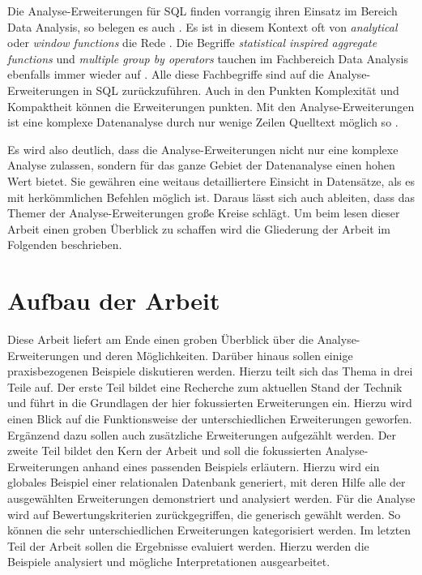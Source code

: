 Die Analyse-Erweiterungen für SQL finden vorrangig ihren Einsatz im Bereich Data
Analysis, so belegen es auch \citet[Kapitel 3]{FOTACHE2015243}. Es ist in diesem
Kontext oft von \textit{analytical} oder \textit{window functions} die Rede
\citep[vgl.][Kapitel 3]{FOTACHE2015243}. Die Begriffe \textit{statistical
inspired aggregate functions} und \textit{multiple group by operators} tauchen im
Fachbereich Data Analysis ebenfalls immer wieder auf \citep[vgl.][Kapitel 4.3]{FOTACHE2015243}.
Alle diese Fachbegriffe sind auf die Analyse-Erweiterungen in SQL zurückzuführen.
Auch in den Punkten Komplexität und Kompaktheit können die Erweiterungen punkten.
Mit den Analyse-Erweiterungen ist eine komplexe Datenanalyse durch nur wenige
Zeilen Quelltext möglich so \citet[vgl.][]{Maue2022}.

Es wird also deutlich, dass die Analyse-Erweiterungen nicht nur eine komplexe
Analyse zulassen, sondern für das ganze Gebiet der Datenanalyse einen hohen Wert
bietet. Sie gewähren eine weitaus detailliertere Einsicht in Datensätze, als es mit
herkömmlichen Befehlen möglich ist. Daraus lässt sich auch ableiten, dass das Themer
der Analyse-Erweiterungen große Kreise schlägt. Um beim lesen dieser Arbeit
einen groben Überblick zu schaffen wird die Gliederung der Arbeit im Folgenden
beschrieben.

\section{Aufbau der Arbeit}
\label{sec:aufbau_der_arbeit} Diese Arbeit liefert am Ende einen groben
Überblick über die Analyse-Erweiterungen und deren Möglichkeiten. Darüber hinaus
sollen einige praxisbezogenen Beispiele diskutieren werden. Hierzu teilt sich
das Thema in drei Teile auf. Der erste Teil bildet eine Recherche zum aktuellen Stand
der Technik und führt in die Grundlagen der hier fokussierten Erweiterungen ein.
Hierzu wird einen Blick auf die Funktionsweise der unterschiedlichen
Erweiterungen geworfen. Ergänzend dazu sollen auch zusätzliche Erweiterungen aufgezählt
werden. Der zweite Teil bildet den Kern der Arbeit und soll die fokussierten
Analyse-Erweiterungen anhand eines passenden Beispiels erläutern. Hierzu wird ein
globales Beispiel einer relationalen Datenbank generiert, mit deren Hilfe alle
der ausgewählten Erweiterungen demonstriert und analysiert werden. Für die Analyse
wird auf Bewertungskriterien zurückgegriffen, die generisch gewählt werden. So können
die sehr unterschiedlichen Erweiterungen kategorisiert werden. Im letzten Teil
der Arbeit sollen die Ergebnisse evaluiert werden. Hierzu werden die Beispiele analysiert
und mögliche Interpretationen ausgearbeitet.

